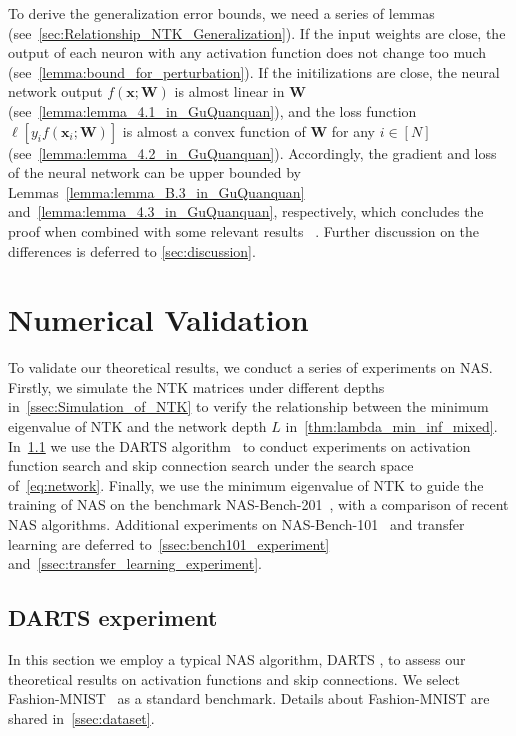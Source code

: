 \documentclass[nohyperref]{article}
\theoremstyle{plain}
\theoremstyle{definition}
\theoremstyle{remark}
\begin{document}
To derive the generalization error bounds, we need a series of lemmas (see~\cref{sec:Relationship_NTK_Generalization}).  If the input weights are close, the output of each neuron with any activation function does not change too much (see~\cref{lemma:bound_for_perturbation}).
If the initilizations are close, the neural network output $f(\bm x; \bm W)$ is almost linear in $\bm W$ (see~\cref{lemma:lemma_4.1_in_GuQuanquan}), and the loss function $\ell[ y_i f(\bm{x}_i;\bm{W}) ]$ is almost a convex function of $\bm W$ for any $i \in [N]$ (see~\cref{lemma:lemma_4.2_in_GuQuanquan}).
Accordingly, the gradient and loss of the neural network can be upper bounded by Lemmas~\ref{lemma:lemma_B.3_in_GuQuanquan} and~\ref{lemma:lemma_4.3_in_GuQuanquan}, respectively, which concludes the proof when combined with some relevant results ~\citep{cao2019generalization,pmlr-v97-allen-zhu19a}.
Further discussion on the differences is deferred to \cref{sec:discussion}. \section{Numerical Validation}
\label{sec:experiment}
To validate our theoretical results, we conduct a series of experiments on NAS. Firstly, we simulate the NTK matrices under different depths in~\cref{ssec:Simulation_of_NTK} to verify the relationship between the minimum eigenvalue of NTK and the network depth $L$ in~\cref{thm:lambda_min_inf_mixed}. In~\cref{ssec:DARTS_experiment} we use the DARTS algorithm~\citep{liu2019darts} to conduct experiments on activation function search and skip connection search under the search space of~\cref{eq:network}. Finally, we use the minimum eigenvalue of NTK to guide the training of NAS on the benchmark NAS-Bench-201~\citep{dong2020nasbench201}, with a comparison of recent NAS algorithms. Additional experiments on NAS-Bench-101~\citep{ying2019bench} and transfer learning are deferred to~\cref{ssec:bench101_experiment} and~\ref{ssec:transfer_learning_experiment}.


\subsection{DARTS experiment}
\label{ssec:DARTS_experiment}

In this section we employ a typical NAS algorithm, DARTS \citep{liu2019darts}, to assess our theoretical results on activation functions and skip connections. We select Fashion-MNIST~\citep{xiao2017fashion} as a standard benchmark. Details about Fashion-MNIST are shared in~\cref{ssec:dataset}. 
\end{document}
